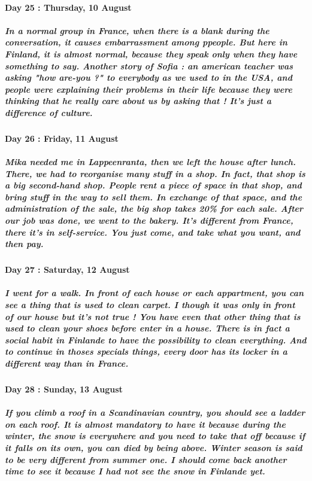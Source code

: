 \documentclass[a4paper,12pt]{report} %
\begin{document}
\paragraph{Day 25 : Thursday, 10 August}
\subparagraph{In a normal group in France, when there is a blank during the conversation, it causes embarrassment among ppeople. But here in Finland, it is almost normal, because they speak only when they have something to say. Another story of Sofia : an american teacher was asking "how are-you ?" to everybody as we used to in the USA, and people were explaining their problems in their life because they were thinking that he really care about us by asking that ! It's just a difference of culture.}

\paragraph{Day 26 : Friday, 11 August}
\subparagraph{Mika needed me in Lappeenranta, then we left the house after lunch. There, we had to reorganise many stuff in a shop. In fact, that shop is a big second-hand shop. People rent a piece of space in that shop, and bring stuff in the way to sell them. In exchange of that space, and the administration of the sale, the big shop takes 20\% for each sale. After our job was done, we went to the bakery. It's different from France, there it's in self-service. You just come, and take what you want, and then pay.}

\paragraph{Day 27 : Saturday, 12 August}
\subparagraph{I went for a walk. In front of each house or each appartment, you can see a thing that is used to clean carpet. I though it was only in front of our house but it's not true ! You have even that other thing that is used to clean your shoes before enter in a house. There is in fact a social habit in Finlande to have the possibility to clean everything. And to continue in thoses specials things, every door has its locker in a different way than in France.}

\paragraph{Day 28 : Sunday, 13 August}
\subparagraph{If you climb a roof in a Scandinavian country, you should see a ladder on each roof. It is almost mandatory to have it because during the winter, the snow is everywhere and you need to take that off because if it falls on its own, you can died by being above. Winter season is said to be very different from summer one. I should come back another time to see it because I had not see the snow in Finlande yet.}
\end{document}
